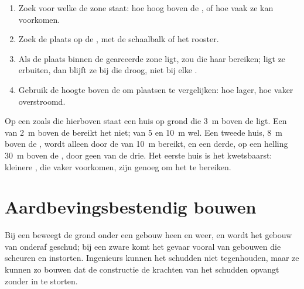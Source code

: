 \begin{method}
\begin{enumerate}
  \item Zoek voor welke  de zone staat: hoe hoog boven de
        , of hoe vaak ze kan voorkomen.
  \item Zoek de plaats op de , met de schaalbalk of het rooster.
  \item Als de plaats binnen de gearceerde zone ligt, zou die 
        haar bereiken; ligt ze erbuiten, dan blijft ze bij die 
        droog, niet bij elke .
  \item Gebruik de hoogte boven de  om plaatsen te vergelijken: hoe
        lager, hoe vaker overstroomd.
\end{enumerate}
\end{method}

\begin{example}
Op een  zoals die hierboven staat een huis op grond die \qty{3}{m}
boven de  ligt. Een  van \qty{2}{m} boven de 
bereikt het niet;  van 5 en \qty{10}{m} wel. Een tweede
huis, \qty{8}{m} boven de , wordt alleen door de  van
\qty{10}{m} bereikt, en een derde, op een helling \qty{30}{m} boven de
, door geen van de drie. Het eerste huis is het kwetsbaarst:
kleinere , die vaker voorkomen, zijn genoeg om het te
bereiken.
\end{example}

\section{Aardbevingsbestendig bouwen}

Bij een  beweegt de grond onder een gebouw heen en weer, en
wordt het gebouw van onderaf geschud; bij een zware  komt het
gevaar vooral van gebouwen die scheuren en instorten. Ingenieurs kunnen
het schudden niet tegenhouden, maar ze kunnen zo bouwen dat de
constructie de krachten van het schudden opvangt zonder in te storten.

